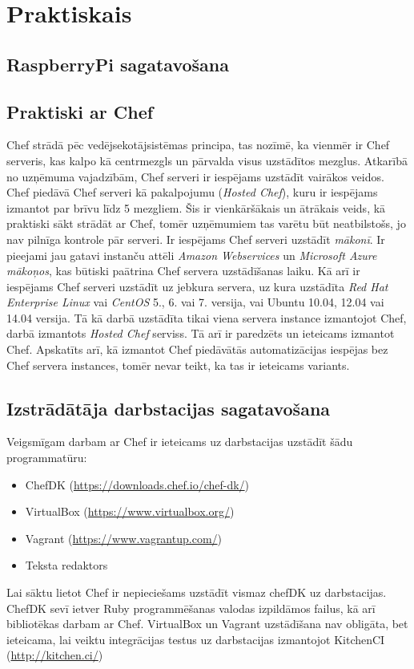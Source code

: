 \chapter{Praktiskais}

\section{RaspberryPi sagatavošana}

\section{Praktiski ar Chef}
Chef strādā pēc vedējsekotājsistēmas principa, tas nozīmē, ka vienmēr ir Chef serveris, kas kalpo kā centrmezgls un pārvalda visus uzstādītos mezglus. Atkarībā no uzņēmuma vajadzībām, Chef serveri ir iespējams uzstādīt vairākos veidos. Chef piedāvā Chef serveri kā pakalpojumu (\textit{Hosted Chef}), kuru ir iespējams izmantot par brīvu līdz 5 mezgliem. Šis ir vienkāršākais un ātrākais veids, kā praktiski sākt strādāt ar Chef, tomēr uzņēmumiem tas varētu būt neatbilstošs, jo nav pilnīga kontrole pār serveri. Ir iespējams Chef serveri uzstādīt \textit{mākonī}. Ir pieejami jau gatavi instanču attēli \textit{Amazon Webservices} un \textit{Microsoft Azure} \textit{mākoņos}, kas būtiski paātrina Chef servera uzstādīšanas laiku. Kā arī ir iespējams Chef serveri uzstādīt uz jebkura servera, uz kura uzstādīta \textit{Red Hat Enterprise Linux} vai \textit{CentOS} 5., 6. vai 7. versija, vai Ubuntu 10.04, 12.04 vai 14.04 versija.
Tā kā darbā uzstādīta tikai viena servera instance izmantojot Chef, darbā izmantots \textit{Hosted Chef} serviss. Tā arī ir paredzēts un ieteicams izmantot Chef.
Apskatīts arī, kā izmantot Chef piedāvātās automatizācijas iespējas bez Chef servera instances, tomēr nevar teikt, ka tas ir ieteicams variants.

\section{Izstrādātāja darbstacijas sagatavošana}
Veigsmīgam darbam ar Chef ir ieteicams uz darbstacijas uzstādīt šādu programmatūru:
\begin{itemize}
	\item ChefDK (\url{https://downloads.chef.io/chef-dk/})
	\item VirtualBox (\url{https://www.virtualbox.org/})
  \item Vagrant (\url{https://www.vagrantup.com/})
  \item Teksta redaktors
\end{itemize}
Lai sāktu lietot Chef ir nepieciešams uzstādīt vismaz chefDK uz darbstacijas. ChefDK sevī ietver Ruby programmēšanas valodas izpildāmos failus, kā arī bibliotēkas darbam ar Chef.
VirtualBox un Vagrant uzstādīšana nav obligāta, bet ieteicama, lai veiktu integrācijas testus uz darbstacijas izmantojot KitchenCI (\url{http://kitchen.ci/})

